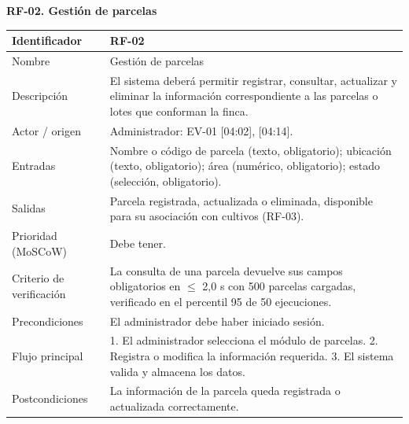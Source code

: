 \documentclass[12pt,a4paper]{article}
\begin{document}
\begin{minipage}{\linewidth}
\bigskip
\noindent\textbf{RF-02. Gestión de parcelas}
\label{tab:RF-02}

\begin{center}
\begin{tabular}{|p{3.5cm}|p{10.7cm}|}
\hline
Identificador & RF-02 \\
\hline
Nombre & Gestión de parcelas \\
\hline
Descripción & El sistema deberá permitir registrar, consultar, actualizar y eliminar la información correspondiente a las parcelas o lotes que conforman la finca. \\
\hline
Actor / origen & Administrador: EV-01 [04:02], [04:14]. \\
\hline
Entradas & Nombre o código de parcela (texto, obligatorio); ubicación (texto, obligatorio); área (numérico, obligatorio); estado (selección, obligatorio). \\
\hline
Salidas & Parcela registrada, actualizada o eliminada, disponible para su asociación con cultivos (RF-03). \\
\hline
Prioridad (MoSCoW) & Debe tener. \\
\hline
Criterio de verificación & La consulta de una parcela devuelve sus campos obligatorios en $\leq$ 2,0 s con 500 parcelas cargadas, verificado en el percentil 95 de 50 ejecuciones. \\
\hline
Precondiciones & El administrador debe haber iniciado sesión. \\
\hline
Flujo principal & 1. El administrador selecciona el módulo de parcelas. 2. Registra o modifica la información requerida. 3. El sistema valida y almacena los datos. \\
\hline
Postcondiciones & La información de la parcela queda registrada o actualizada correctamente. \\
\hline
\end{tabular}
\end{center}
\end{minipage}
\end{document}
